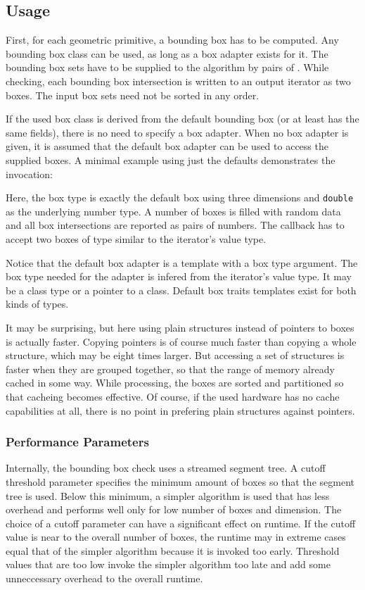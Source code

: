 \subsection{Usage}
First, for each geometric primitive, a bounding box has to be computed. Any bounding box class can be used, as long as a box adapter exists for it. The bounding box sets have to be supplied to the algorithm by pairs of . While checking, each bounding box intersection is written to an output iterator as two boxes. The input box sets need not be sorted in any order.

If the used box class is derived from the default bounding box (or at least has the same fields), there is no need to specify a box adapter. When no box adapter is given, it is assumed that the default box adapter can be used to access the supplied boxes. A minimal example using just the defaults demonstrates the invocation:


Here, the box type is exactly the default box using three dimensions and \texttt{double} as the underlying number type. A number of boxes is filled with random data and all box intersections are reported as pairs of numbers. The callback has to accept two boxes of type similar to the iterator's value type.

Notice that the default box adapter is a template with a box type argument. The box type needed for the adapter is infered from the iterator's value type. It may be a class type or a pointer to a class. Default box traits templates exist for both kinds of types.

It may be surprising, but here using plain structures instead of pointers to boxes is actually faster. Copying pointers is of course much faster than copying a whole structure, which may be eight times larger. But accessing a set of structures is faster when they are grouped together, so that the range of memory already cached in some way. While processing, the boxes are sorted and partitioned so that cacheing becomes effective. Of course, if the used hardware has no cache capabilities at all, there is no point in prefering plain structures against pointers.

\subsubsection*{Performance Parameters}
Internally, the bounding box check uses a streamed segment tree. A cutoff threshold parameter specifies the minimum amount of boxes so that the segment tree is used. Below this minimum, a simpler algorithm is used that has less overhead and performs well only for low number of boxes and dimension. The choice of a cutoff parameter can have a significant effect on runtime. If the cutoff value is near to the overall number of boxes, the runtime may in extreme cases equal that of the simpler algorithm because it is invoked too early. Threshold values that are too low invoke the simpler algorithm too late and add some unneccessary overhead to the overall runtime.

